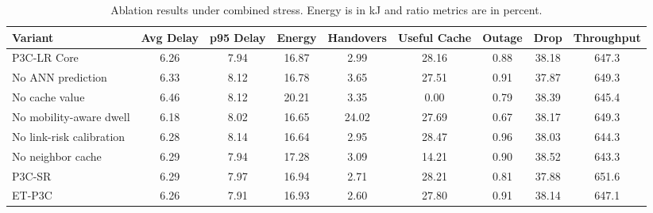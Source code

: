 \begin{table}[!t]
\centering
\caption{Ablation results under combined stress. Energy is in kJ and ratio metrics are in percent.}
\label{tab:ablation}
\scriptsize
\begin{tabular}{lcccccccc}
\toprule
Variant & Avg Delay & p95 Delay & Energy & Handovers & Useful Cache & Outage & Drop & Throughput \\
\midrule
P3C-LR Core & 6.26 & 7.94 & 16.87 & 2.99 & 28.16 & 0.88 & 38.18 & 647.3 \\
No ANN prediction & 6.33 & 8.12 & 16.78 & 3.65 & 27.51 & 0.91 & 37.87 & 649.3 \\
No cache value & 6.46 & 8.12 & 20.21 & 3.35 & 0.00 & 0.79 & 38.39 & 645.4 \\
No mobility-aware dwell & 6.18 & 8.02 & 16.65 & 24.02 & 27.69 & 0.67 & 38.17 & 649.3 \\
No link-risk calibration & 6.28 & 8.14 & 16.64 & 2.95 & 28.47 & 0.96 & 38.03 & 644.3 \\
No neighbor cache & 6.29 & 7.94 & 17.28 & 3.09 & 14.21 & 0.90 & 38.52 & 643.3 \\
P3C-SR & 6.29 & 7.97 & 16.94 & 2.71 & 28.21 & 0.81 & 37.88 & 651.6 \\
ET-P3C & 6.26 & 7.91 & 16.93 & 2.60 & 27.80 & 0.91 & 38.14 & 647.1 \\
\bottomrule
\end{tabular}
\end{table}
